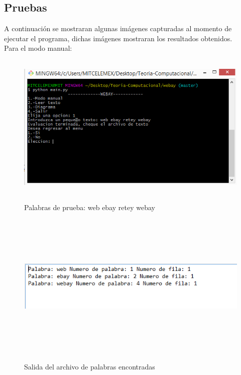 \subsection{Pruebas}
A continuaci\'on se mostraran algunas im\'agenes capturadas al momento de ejecutar el programa, dichas im\'agenes mostraran los resultados obtenidos.\\
\vspace{1.0cm}
Para el modo manual:\\
\begin{figure}[H]
\includegraphics[width=\textwidth, height=7cm]{ModoManualWebay.png}
\label{fig:manual_webay}
\caption{Palabras de prueba: web ebay retey webay}
\end{figure}

\begin{figure}[H]
\includegraphics[width=\textwidth, height=7cm]{ArchivoWebay.png}
\label{fig:manualtexto_alfabeto}
\caption{Salida del archivo de palabras encontradas}
\end{figure}

